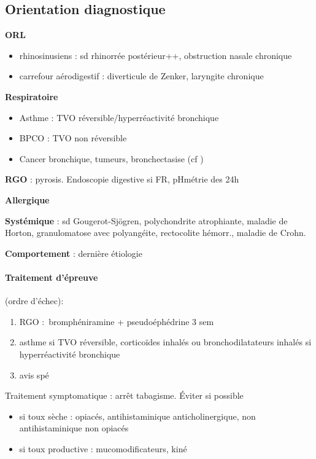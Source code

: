 \subsection{Orientation diagnostique}
\label{subsec:toux_orientation}
\textbf{ORL}  
\begin{itemize}
\item rhinosinusiens : sd rhinorrée postérieur++, obstruction nasale chronique
\item carrefour aérodigestif : diverticule de Zenker, laryngite chronique
\end{itemize}

\textbf{Respiratoire} 
\begin{itemize}
\item Asthme : TVO réversible/hyperréactivité bronchique
\item BPCO : TVO non réversible
\item Cancer bronchique, tumeurs, bronchectasise (cf
  )
\end{itemize}

\textbf{RGO} : pyrosis. Endoscopie digestive si FR, pHmétrie des 24h

\textbf{Allergique} 

\textbf{Systémique} : sd Gougerot-Sjögren, polychondrite atrophiante, maladie
de Horton, granulomatose avec polyangéite, rectocolite hémorr., maladie de
Crohn.

\textbf{Comportement} : dernière étiologie

\paragraph{Traitement d'épreuve} (ordre d'échec):
\begin{enumerate}
\item RGO : bromphéniramine + pseudoéphédrine 3 sem
\item asthme si TVO réversible, corticoïdes inhalés ou bronchodilatateurs inhalés si
  hyperréactivité bronchique
\item avis spé
\end{enumerate}

Traitement symptomatique : arrêt tabagisme. Éviter si possible
\begin{itemize}
\item si toux sèche : opiacés, antihistaminique anticholinergique, non
  antihistaminique non opiacés
\item si toux productive : mucomodificateurs, kiné
\end{itemize}

